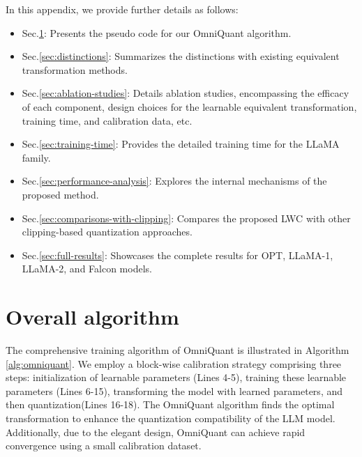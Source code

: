 \documentclass{article} %
\begin{document}
\renewcommand{\thetable}{A\arabic{table}}
\renewcommand{\thefigure}{A\arabic{figure}}
\renewcommand{\theequation}{A\arabic{equation}}
\renewcommand{\thesection}{A\arabic{section}}

\setcounter{table}{0}
\setcounter{figure}{0}

In this appendix, we provide further details as follows:
\begin{itemize}
\item Sec.\ref{sec:algorithm}: Presents the pseudo code for our OmniQuant algorithm.
\item {Sec.\ref{sec:distinctions}: Summarizes the distinctions with existing equivalent transformation methods}.
\item Sec.\ref{sec:ablation-studies}: Details ablation studies, encompassing the efficacy of each component, design choices for the learnable equivalent transformation, training time, and calibration data, etc.
\item Sec.\ref{sec:training-time}: Provides the detailed training time for the LLaMA family.
\item Sec.\ref{sec:performance-analysis}: Explores the internal mechanisms of the proposed method.
\item Sec.\ref{sec:comparisons-with-clipping}: Compares the proposed LWC with other clipping-based quantization approaches.
\item Sec.\ref{sec:full-results}: Showcases the complete results for OPT, LLaMA-1, LLaMA-2, and Falcon models.
\end{itemize}

\section{Overall algorithm}\label{sec:algorithm}
The comprehensive training algorithm of OmniQuant is illustrated in Algorithm\,\ref{alg:omniquant}.
%
We employ a block-wise calibration strategy comprising three steps: initialization of learnable parameters (Lines 4-5), training these learnable parameters (Lines 6-15), transforming the model with learned parameters, and then quantization(Lines 16-18).
%
The OmniQuant algorithm finds the optimal transformation to enhance the quantization compatibility of the LLM model. Additionally, due to the elegant design, OmniQuant can achieve rapid convergence using a small calibration dataset.
\end{document}
